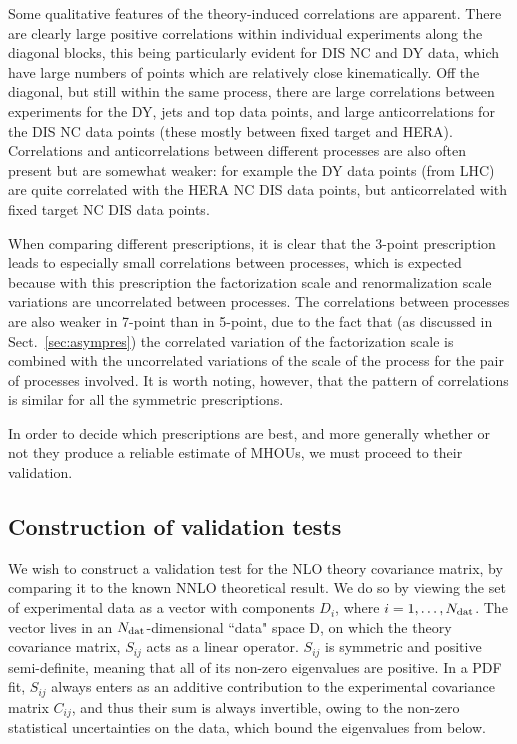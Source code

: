 Some qualitative features of the theory-induced correlations are apparent.
There are clearly large positive correlations within individual
experiments along the diagonal blocks, this being particularly evident for 
DIS NC and DY data, which have large numbers of points which are 
relatively close kinematically.
%
Off the diagonal, but still within the same process, there are 
large correlations between experiments for the DY, jets and top data points, and
large anticorrelations for the DIS NC data points (these mostly between fixed 
target and HERA). Correlations and
anticorrelations between different processes are also often present but are
somewhat weaker: for example the DY data points (from LHC) are quite 
correlated with the HERA NC DIS data points, but anticorrelated with 
fixed target NC DIS data points.  

When comparing different prescriptions, it is clear that the
3-point prescription leads to especially small correlations
between processes, which is expected because with this prescription the
factorization scale and renormalization scale variations are uncorrelated between processes. The correlations between processes are also weaker in
7-point than in 5-point, due to the fact that (as discussed in
Sect.~\ref{sec:asympres}) the correlated variation of the
factorization scale is combined with the uncorrelated variations of
the scale of the process for the pair of processes involved. It is worth
noting, however, that the pattern of correlations is similar 
for all the symmetric prescriptions.

In order to decide which prescriptions are best, and
more generally whether or not they produce a reliable estimate
of MHOUs, we must proceed to their validation.


\subsection{Construction of validation tests}
\label{sec:validconstruction}

We wish to construct a validation test for the NLO theory covariance
matrix, by comparing it to the known NNLO theoretical result. We do so by
viewing the set of experimental data as a vector with components
$D_i$, where $i=1, \ldots, N_{\rm dat}$. The vector lives in an
$N_{\rm dat}$-dimensional ``data" space D, on which the theory covariance matrix, $S_{ij}$ acts as a linear operator. $S_{ij}$ is symmetric and positive semi-definite, meaning that all of its non-zero eigenvalues are positive.
%
In a PDF fit, $S_{ij}$ always enters as an additive contribution to the experimental covariance matrix $C_{ij}$, and thus 
their sum is always invertible, owing to the non-zero statistical uncertainties on the data, which bound the eigenvalues from below.
 
